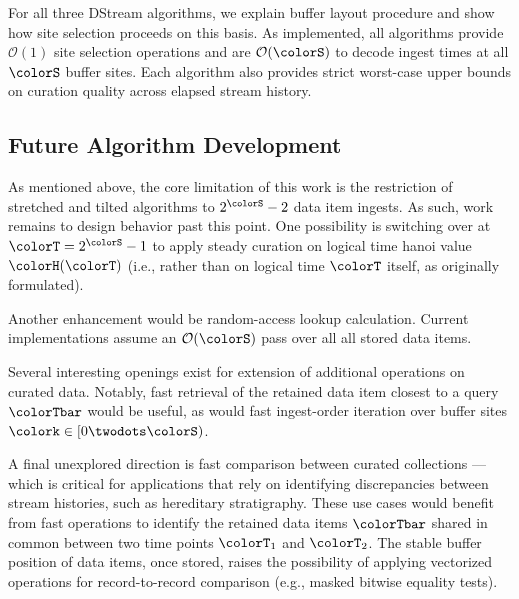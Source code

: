 For all three DStream algorithms, we explain buffer layout procedure and show how site selection proceeds on this basis.
As implemented, all algorithms provide $\mathcal{O}(1)$ site selection operations and are $\mathcal{O}(\colorS)$ to decode ingest times at all $\colorS$ buffer sites.
Each algorithm also provides strict worst-case upper bounds on curation quality across elapsed stream history.

\subsection{Future Algorithm Development}

As mentioned above, the core limitation of this work is the restriction of stretched and tilted algorithms to $2^{\colorS} - 2$ data item ingests.
As such, work remains to design behavior past this point.
One possibility is switching over at $\colorT = 2^{\colorS} - 1$ to apply steady curation on logical time hanoi value $\colorH(\colorT)$ (i.e., rather than on logical time $\colorT$ itself, as originally formulated).

Another enhancement would be random-access lookup calculation.
Current implementations assume an $\mathcal{O}(\colorS)$ pass over all all stored data items.

Several interesting openings exist for extension of additional operations on curated data.
Notably, fast retrieval of the retained data item closest to a query $\colorTbar$ would be useful, as would fast ingest-order iteration over buffer sites $\colork \in [0 \twodots \colorS)$.

A final unexplored direction is fast comparison between curated collections --- which is critical for applications that rely on identifying discrepancies between stream histories, such as hereditary stratigraphy.
These use cases would benefit from fast operations to identify the retained data items $\colorTbar$ shared in common between two time points $\colorT_1$ and $\colorT_2$.
The stable buffer position of data items, once stored, raises the possibility of applying vectorized operations for record-to-record comparison (e.g., masked bitwise equality tests).


